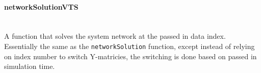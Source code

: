 \documentclass[12pt]{article}
\begin{document}
\paragraph{networkSolutionVTS} \ \\
A function that solves the system network at the passed in data index.
Essentially the same as the \verb|networkSolution| function, except instead of relying on index number to switch Y-matricies, the switching is done based on passed in simulation time.

\end{document}
